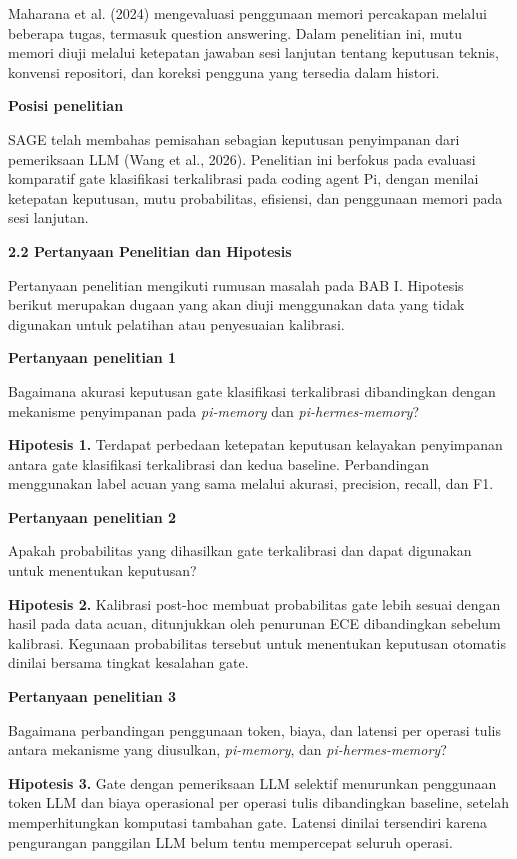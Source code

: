 \documentclass[
]{article}
\begin{document}
Maharana et al. (2024) mengevaluasi penggunaan memori percakapan melalui beberapa tugas, termasuk question answering. Dalam penelitian ini, mutu memori diuji melalui ketepatan jawaban sesi lanjutan tentang keputusan teknis, konvensi repositori, dan koreksi pengguna yang tersedia dalam histori.

\textbf{Posisi penelitian}

SAGE telah membahas pemisahan sebagian keputusan penyimpanan dari pemeriksaan LLM (Wang et al., 2026). Penelitian ini berfokus pada evaluasi komparatif gate klasifikasi terkalibrasi pada coding agent Pi, dengan menilai ketepatan keputusan, mutu probabilitas, efisiensi, dan penggunaan memori pada sesi lanjutan.

\textbf{2.2 Pertanyaan Penelitian dan Hipotesis}\label{sec:2.2}

Pertanyaan penelitian mengikuti rumusan masalah pada BAB I. Hipotesis berikut merupakan dugaan yang akan diuji menggunakan data yang tidak digunakan untuk pelatihan atau penyesuaian kalibrasi.

\textbf{Pertanyaan penelitian 1}

Bagaimana akurasi keputusan gate klasifikasi terkalibrasi dibandingkan dengan mekanisme penyimpanan pada \emph{pi-memory} dan \emph{pi-hermes-memory}?

\textbf{Hipotesis 1.} Terdapat perbedaan ketepatan keputusan kelayakan penyimpanan antara gate klasifikasi terkalibrasi dan kedua baseline. Perbandingan menggunakan label acuan yang sama melalui akurasi, precision, recall, dan F1.

\textbf{Pertanyaan penelitian 2}

Apakah probabilitas yang dihasilkan gate terkalibrasi dan dapat digunakan untuk menentukan keputusan?

\textbf{Hipotesis 2.} Kalibrasi post-hoc membuat probabilitas gate lebih sesuai dengan hasil pada data acuan, ditunjukkan oleh penurunan ECE dibandingkan sebelum kalibrasi. Kegunaan probabilitas tersebut untuk menentukan keputusan otomatis dinilai bersama tingkat kesalahan gate.

\textbf{Pertanyaan penelitian 3}

Bagaimana perbandingan penggunaan token, biaya, dan latensi per operasi tulis antara mekanisme yang diusulkan, \emph{pi-memory}, dan \emph{pi-hermes-memory}?

\textbf{Hipotesis 3.} Gate dengan pemeriksaan LLM selektif menurunkan penggunaan token LLM dan biaya operasional per operasi tulis dibandingkan baseline, setelah memperhitungkan komputasi tambahan gate. Latensi dinilai tersendiri karena pengurangan panggilan LLM belum tentu mempercepat seluruh operasi.
\end{document}
